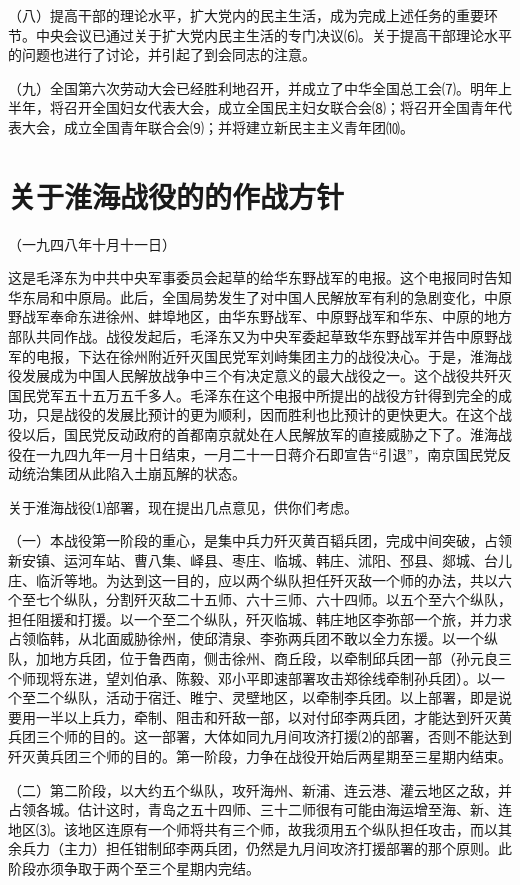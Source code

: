 \documentclass[UTF-8, a5paper, 12pt]{ctexart}
\begin{document}
（八）提高干部的理论水平，扩大党内的民主生活，成为完成上述任务的重要环节。中央会议已通过关于扩大党内民主生活的专门决议⑹。关于提高干部理论水平的问题也进行了讨论，并引起了到会同志的注意。

（九）全国第六次劳动大会已经胜利地召开，并成立了中华全国总工会⑺。明年上半年，将召开全国妇女代表大会，成立全国民主妇女联合会⑻；将召开全国青年代表大会，成立全国青年联合会⑼；并将建立新民主主义青年团⑽。

\section{关于淮海战役的的作战方针}

（一九四八年十月十一日）

这是毛泽东为中共中央军事委员会起草的给华东野战军的电报。这个电报同时告知华东局和中原局。此后，全国局势发生了对中国人民解放军有利的急剧变化，中原野战军奉命东进徐州、蚌埠地区，由华东野战军、中原野战军和华东、中原的地方部队共同作战。战役发起后，毛泽东又为中央军委起草致华东野战军并告中原野战军的电报，下达在徐州附近歼灭国民党军刘峙集团主力的战役决心。于是，淮海战役发展成为中国人民解放战争中三个有决定意义的最大战役之一。这个战役共歼灭国民党军五十五万五千多人。毛泽东在这个电报中所提出的战役方针得到完全的成功，只是战役的发展比预计的更为顺利，因而胜利也比预计的更快更大。在这个战役以后，国民党反动政府的首都南京就处在人民解放军的直接威胁之下了。淮海战役在一九四九年一月十日结束，一月二十一日蒋介石即宣告“引退”，南京国民党反动统治集团从此陷入土崩瓦解的状态。

关于淮海战役⑴部署，现在提出几点意见，供你们考虑。

（一）本战役第一阶段的重心，是集中兵力歼灭黄百韬兵团，完成中间突破，占领新安镇、运河车站、曹八集、峄县、枣庄、临城、韩庄、沭阳、邳县、郯城、台儿庄、临沂等地。为达到这一目的，应以两个纵队担任歼灭敌一个师的办法，共以六个至七个纵队，分割歼灭敌二十五师、六十三师、六十四师。以五个至六个纵队，担任阻援和打援。以一个至二个纵队，歼灭临城、韩庄地区李弥部一个旅，并力求占领临韩，从北面威胁徐州，使邱清泉、李弥两兵团不敢以全力东援。以一个纵队，加地方兵团，位于鲁西南，侧击徐州、商丘段，以牵制邱兵团一部（孙元良三个师现将东进，望刘伯承、陈毅、邓小平即速部署攻击郑徐线牵制孙兵团）。以一个至二个纵队，活动于宿迁、睢宁、灵壁地区，以牵制李兵团。以上部署，即是说要用一半以上兵力，牵制、阻击和歼敌一部，以对付邱李两兵团，才能达到歼灭黄兵团三个师的目的。这一部署，大体如同九月间攻济打援⑵的部署，否则不能达到歼灭黄兵团三个师的目的。第一阶段，力争在战役开始后两星期至三星期内结束。

（二）第二阶段，以大约五个纵队，攻歼海州、新浦、连云港、灌云地区之敌，并占领各城。估计这时，青岛之五十四师、三十二师很有可能由海运增至海、新、连地区⑶。该地区连原有一个师将共有三个师，故我须用五个纵队担任攻击，而以其余兵力（主力）担任钳制邱李两兵团，仍然是九月间攻济打援部署的那个原则。此阶段亦须争取于两个至三个星期内完结。
\end{document}
